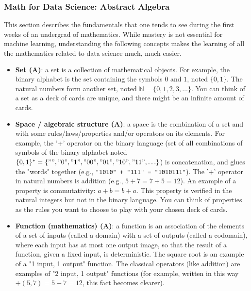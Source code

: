 \documentclass{article}
\begin{document}
\subsubsection*{Math for Data Science: Abstract Algebra}

This section describes the fundamentals that one tends to see during the first weeks of an undergrad of mathematics. While mastery is not essential for machine learning, understanding the following concepts makes the learning of all the mathematics related to data science much, much easier.

\begin{itemize}

	\item \textbf{Set (A)}: a set is a collection of mathematical objects. For example, the binary alphabet is the set containing the symbols $0$ and $1$, noted $\{0, 1\}$. The natural numbers form another set, noted $\mathbb{N} = \{0, 1, 2, 3, \dots\}$. You can think of a set as a deck of cards are unique, and there might be an infinite amount of cards.

	\item \textbf{Space / algebraic structure (A)}: a space is the combination of a set and with some rules/laws/properties and/or operators on its elements. For example, the '+' operator on the binary language (set of all combinations of symbols of the binary alphabet noted $\{0, 1\}^* = \{"", "0", "1", "00", "01", \\ "10", "11", \ldots\}$) is concatenation, and glues the "words" together (e.g., \texttt{"1010" + "111" = "1010111"}). The '+' operator in natural numbers is addition (e.g., $5 + 7 = 7 + 5 = 12$). An example of a property is commutativity: $a + b = b + a$. This property is verified in the natural integers but not in the binary language. You can think of properties as the rules you want to choose to play with your chosen deck of cards.

	\item \textbf{Function (mathematics) (A)}: a function is an association of the elements of a set of inputs (called a domain) with a set of outputs (called a codomain), where each input has at most one output image, so that the result of a function, given a fixed input, is deterministic. The square root is an example of a "1 input, 1 output" function. The classical operators (like addition) are examples of "2 input, 1 output" functions (for example, written in this way $+(5, 7) = 5 + 7 = 12$, this fact becomes clearer).


\end{itemize}
\end{document}
